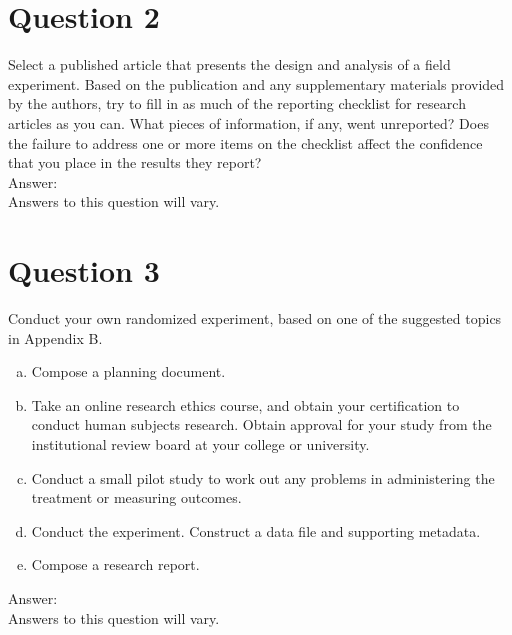 \documentclass[11pt,notitlepage]{article}\usepackage[]{graphicx}\usepackage[]{color}
\begin{document}
\section*{Question 2}
Select a published article that presents the design and analysis of a field experiment. Based on the publication and any supplementary materials provided by the authors, try to fill in as much of the reporting checklist for research articles as you can. What pieces of information, if any, went unreported? Does the failure to address one or more items on the checklist affect the confidence that you place in the results they report?\\
Answer:\\
Answers to this question will vary.


\section*{Question 3}
Conduct your own randomized experiment, based on one of the suggested topics in Appendix B.
\begin{enumerate}[a)]
\item Compose a planning document.
\item Take an online research ethics course, and obtain your certification to conduct human subjects research. Obtain approval for your study from the institutional review board at your college or university.
\item Conduct a small pilot study to work out any problems in administering the treatment or measuring outcomes.
\item Conduct the experiment. Construct a data file and supporting metadata.
\item Compose a research report.
\end{enumerate}
Answer:\\
Answers to this question will vary.
\end{document}
